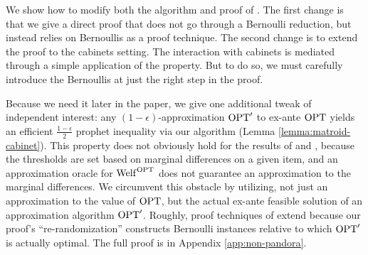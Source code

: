 We show how to modify both the algorithm and proof of \citet{lee2018optimal}.
The first change is that we give a direct proof that does not go through a Bernoulli reduction, but instead relies on Bernoullis as a proof technique.
The second change is to extend the proof to the cabinets setting.
The interaction with cabinets is mediated through a simple application of the \SAUP{} property.
But to do so, we must carefully introduce the Bernoullis at just the right step in the proof.

Because we need it later in the paper, we give one additional tweak of independent interest: any $(1-\epsilon)$-approximation $\mathrm{OPT}'$ to ex-ante $\mathrm{OPT}$ yields an efficient $\tfrac{1-\epsilon}{2}$ prophet inequality via our algorithm (Lemma \ref{lemma:matroid-cabinet}).
This property does not obviously hold for the results of \citet{kleinberg2012matroid} and \citet{lee2018optimal}, because the thresholds are set based on marginal differences on a given item, and an approximation oracle for $\mathrm{Welf}^{\mathrm{OPT}}$ does not guarantee an approximation to the marginal differences.
We circumvent this obstacle by utilizing, not just an approximation to the value of $\mathrm{OPT}$, but the actual ex-ante feasible solution of an approximation algorithm $\mathrm{OPT}'$.
Roughly, proof techniques of \citet{kleinberg2012matroid} extend because our proof's ``re-randomization'' constructs Bernoulli instances relative to which $\mathrm{OPT}'$ is actually optimal.
The full proof is in Appendix \ref{app:non-pandora}.


